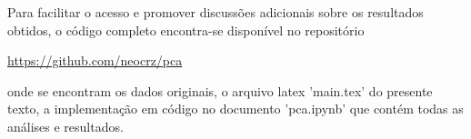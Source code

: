 \documentclass[12pt, a4paper]{article}
\begin{document}
\par Para facilitar o acesso e promover discussões adicionais sobre os resultados obtidos, o código completo encontra-se disponível no repositório
\begin{center}
\url{ https://github.com/neocrz/pca }
\end{center}
onde se encontram os dados originais, o arquivo latex 'main.tex' do presente texto, a implementação em código no documento 'pca.ipynb' que contém todas as análises e resultados.
\newpage
\printbibliography
\end{document}
